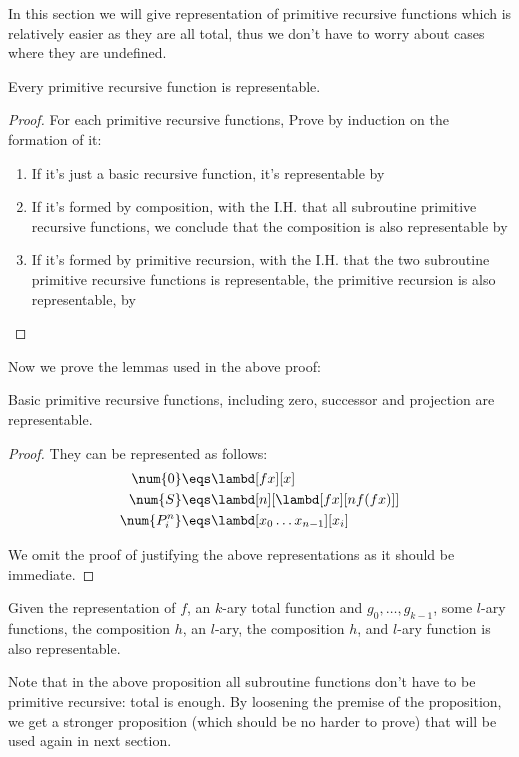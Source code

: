 \documentclass[../../../include/open-logic-section]{subfiles}
\begin{document}

In this section we will give representation of primitive recursive
functions which is relatively easier as they are all total, thus we don't have to worry about cases where they are
undefined.

\begin{prop}
  Every primitive recursive function is representable.
\end{prop}
\begin{proof}
  For each primitive recursive functions, Prove by induction on
  the formation of it:
  \begin{enumerate}
  \item If it's just a basic recursive function, it's representable by
  \item If it's formed by composition, with the I.H. that all
    subroutine primitive recursive functions, we
    conclude that the composition is also representable by
  \item If it's formed by primitive recursion, with the I.H. that the
    two subroutine primitive recursive functions is representable, the
    primitive recursion is also representable, by 
  \end{enumerate}
\end{proof}

Now we prove the lemmas used in the above proof:

\begin{lem}
  Basic primitive recursive functions, including zero, successor and
  projection are representable.
\end{lem}
\begin{proof}
  They can be represented as follows:
  \begin{align*}
    \num{0} &\eqs \lambd[fx][x]\\
    \num{S} &\eqs \lambd[n][\lambd[fx][n f (f x)]] \\
    \num{P^n_i} &\eqs \lambd[x_0\dots x_{n-1}][x_i] \\
  \end{align*}

  We omit the proof of justifying the above representations as it should
  be immediate.
\end{proof}

\begin{lem}
  Given the representation of $f$, an $k$-ary total function and $g_0,
  \dots, g_{k-1}$, some $l$-ary functions, the composition $h$, an
  $l$-ary, the composition $h$, and $l$-ary function is also representable.
\end{lem}
Note that in the above proposition all subroutine functions don't have
to be primitive recursive: total is enough. By loosening the premise
of the proposition, we get a stronger proposition (which should be no harder
to prove) that will be used again in next section.
\end{document}
